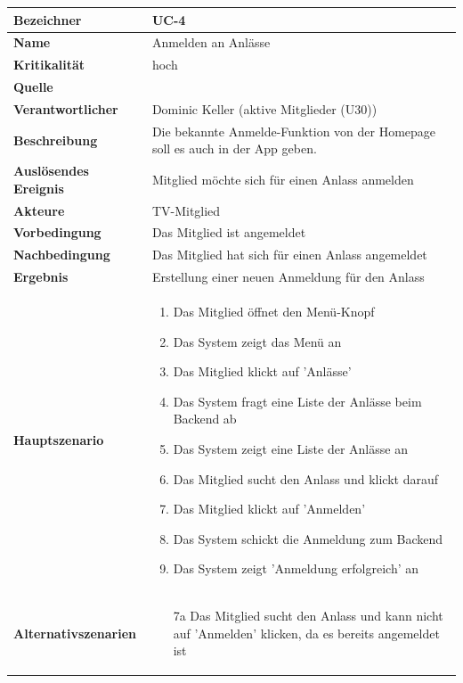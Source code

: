 \begin{table}[ht]
\centering
  \begin{tabular}{ l | p{10cm} }
	\hline
	\rowcolor{gray}
	\textbf{Bezeichner}		&	\textbf{UC-4}\\ \hline
	\textbf{Name}			&	Anmelden an Anlässe\\ \hline
	\textbf{Kritikalität}		&	hoch\\ \hline
	\textbf{Quelle}			&	\glossarmark{Stakeholder}\\ \hline
	\textbf{Verantwortlicher}	&	Dominic Keller (aktive Mitglieder (U30))\\ \hline
	\textbf{Beschreibung}	&	Die bekannte Anmelde-Funktion von der Homepage soll es auch in der App geben.\\ \hline
	\textbf{Auslösendes Ereignis}&	Mitglied möchte sich für einen Anlass anmelden\\ \hline
	\textbf{Akteure}		&	TV-Mitglied\\ \hline
	\textbf{Vorbedingung}	&	Das Mitglied ist angemeldet\\ \hline
	\textbf{Nachbedingung}	&	Das Mitglied hat sich für einen Anlass angemeldet\\ \hline
	\textbf{Ergebnis}		&	Erstellung einer neuen Anmeldung für den Anlass\\ \hline
	\textbf{Hauptszenario}	&	\begin{enumerate}
					\item Das Mitglied öffnet den Menü-Knopf
					\item Das System zeigt das Menü an
					\item Das Mitglied klickt auf 'Anlässe'
					\item Das System fragt eine Liste der Anlässe beim Backend ab
					\item Das System zeigt eine Liste der Anlässe an
					\item Das Mitglied sucht den Anlass und klickt darauf
					\item Das Mitglied klickt auf 'Anmelden'
					\item Das System schickt die Anmeldung zum Backend
					\item Das System zeigt 'Anmeldung erfolgreich' an
					\end{enumerate}
					\\ \hline
	\textbf{Alternativszenarien}	&	\begin{enumerate}
					\item[7a] Das Mitglied sucht den Anlass und kann nicht auf 'Anmelden' klicken, da es bereits angemeldet ist

\end{enumerate}
\end{tabular}
\end{table}
